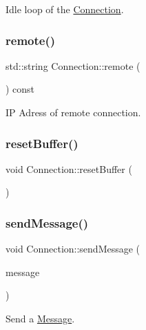 Idle loop of the \mbox{\hyperlink{classConnection}{Connection}}. 

\mbox{\label{classConnection_ae1d2f498761143716cc12fdc76b46203}} 
\subsubsection{\texorpdfstring{remote()}{remote()}}
{\footnotesize\ttfamily std\+::string Connection\+::remote (\begin{DoxyParamCaption}{ }\end{DoxyParamCaption}) const}



IP Adress of remote connection. 

\mbox{\label{classConnection_a489def548f673328fe383c5625224367}} 
\subsubsection{\texorpdfstring{reset\+Buffer()}{resetBuffer()}}
{\footnotesize\ttfamily void Connection\+::reset\+Buffer (\begin{DoxyParamCaption}{ }\end{DoxyParamCaption})\hspace{0.3cm}{\ttfamily [private]}}

\mbox{\label{classConnection_ad8fa49332af5ccc42768f94bdf711187}} 
\subsubsection{\texorpdfstring{send\+Message()}{sendMessage()}}
{\footnotesize\ttfamily void Connection\+::send\+Message (\begin{DoxyParamCaption}\item[{\mbox{\hyperlink{classMessage_a3f7f2aa1058cb5f0b74a1fbb7fcd00e5}{Message\+::message\+Pointer}}}]{message }\end{DoxyParamCaption})}



Send a \mbox{\hyperlink{classMessage}{Message}}. 



